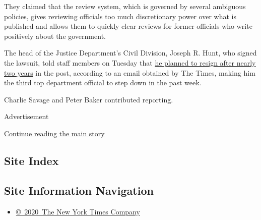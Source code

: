 They claimed that the review system, which is governed by several
ambiguous policies, gives reviewing officials too much discretionary
power over what is published and allows them to quickly clear reviews
for former officials who write positively about the government.

The head of the Justice Department's Civil Division, Joseph R. Hunt, who
signed the lawsuit, told staff members on Tuesday that
\href{https://www.nytimes.com/2020/06/16/us/politics/justice-department-jody-hunt.html}{he
planned to resign after nearly two years} in the post, according to an
email obtained by The Times, making him the third top department
official to step down in the past week.

Charlie Savage and Peter Baker contributed reporting.

Advertisement

\protect\hyperlink{after-bottom}{Continue reading the main story}

\hypertarget{site-index}{%
\subsection{Site Index}\label{site-index}}

\hypertarget{site-information-navigation}{%
\subsection{Site Information
Navigation}\label{site-information-navigation}}

\begin{itemize}
\tightlist
\item
  \href{https://help.nytimes.com/hc/en-us/articles/115014792127-Copyright-notice}{©~2020~The
  New York Times Company}
\end{itemize}

